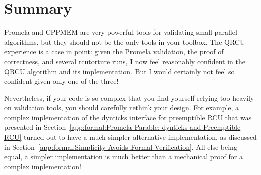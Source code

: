 \section{Summary}
\label{app:formal:Summary}

Promela and CPPMEM are very powerful tools for validating small
parallel algorithms, but they should not be the only tools in your
toolbox.
The QRCU experience is a case in point: given the Promela validation,
the proof of correctness, and several
rcutorture
runs, I now feel
reasonably confident in the QRCU algorithm and its implementation.
But I would certainly not feel so confident given only one of the three!

Nevertheless, if your code is so complex that you find yourself
relying too heavily on validation
tools, you should carefully rethink your design.
For example, a complex implementation of the dynticks interface for
preemptible RCU that was presented in
Section~\ref{app:formal:Promela Parable: dynticks and Preemptible RCU}
turned out to
have a much simpler alternative implementation, as discussed in
Section~\ref{app:formal:Simplicity Avoids Formal Verification}.
All else being equal, a simpler implementation is much better than
a mechanical proof for a complex implementation!
